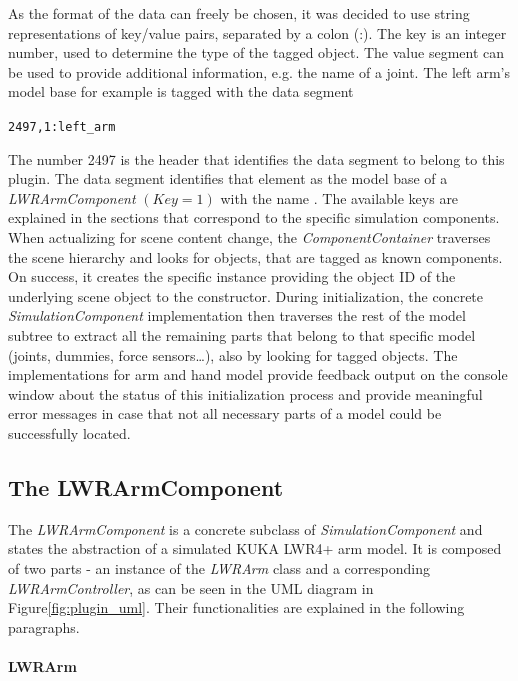 As the format of the data can freely be chosen, it was decided to use string representations of key/value pairs, separated by a colon (:). The key is an integer number, used to determine the type of the tagged object. The value segment can be used to provide additional information, e.g. the name of a joint. The left arm's model base for example is tagged with the data segment 
\begin{center}
\texttt{2497,1:left\_arm}
\end{center}
The number 2497 is the header that identifies the data segment to belong to this plugin. The data segment identifies that element as the model base of a \emph{LWRArmComponent} $(Key=1)$ with the name . The available keys are explained in the sections that correspond to the specific simulation components. When actualizing for scene content change, the \emph{ComponentContainer} traverses the scene hierarchy and looks for objects, that are tagged as known components. On success, it creates the specific instance providing the object ID of the underlying scene object to the constructor. During initialization, the concrete \emph{SimulationComponent} implementation then traverses the rest of the model subtree to extract all the remaining parts that belong to that specific model (joints, dummies, force sensors\ldots), also by looking for tagged objects. The implementations for arm and hand model provide feedback output on the console window about the status of this initialization process and provide meaningful error messages in case that not all necessary parts of a model could be successfully located.

\subsection{The LWRArmComponent}

The \emph{LWRArmComponent} is a concrete subclass of \emph{SimulationComponent} and states the abstraction of a simulated KUKA LWR4+ arm model. It is composed of two parts - an instance of the \emph{LWRArm} class and a corresponding \emph{LWRArmController}, as can be seen in the UML diagram in Figure\ref{fig:plugin_uml}. Their functionalities are explained in the following paragraphs.

\paragraph{LWRArm}


